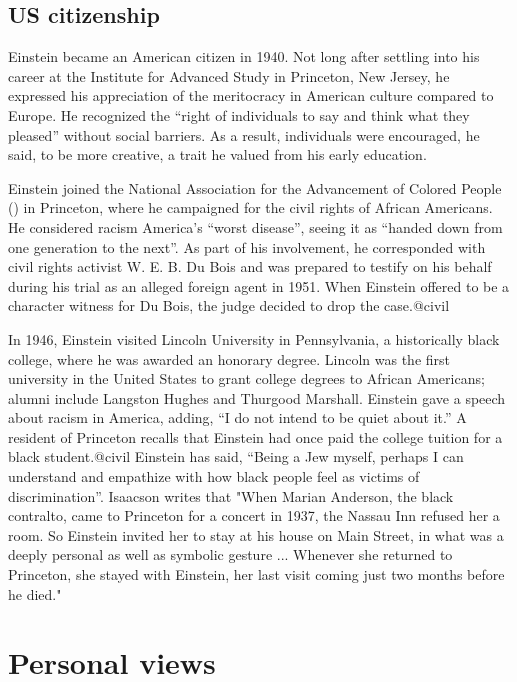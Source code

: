 \documentclass[twoside]{memoir}
\begin{document}
\section{US citizenship}
Einstein became an American citizen in 1940. Not long after settling into his career at the Institute for Advanced Study in Princeton, New Jersey, he expressed his appreciation of the meritocracy in American culture compared to Europe. He recognized the \enquote{right of individuals to say and think what they pleased} without social barriers. As a result, individuals were encouraged, he said, to be more creative, a trait he valued from his early education.

Einstein joined the National Association for the Advancement of Colored People () in Princeton, where he campaigned for the civil rights of African Americans. He considered racism America's \enquote{worst disease}, seeing it as \enquote{handed down from one generation to the next}. As part of his involvement, he corresponded with civil rights activist W. E. B. Du Bois and was prepared to testify on his behalf during his trial as an alleged foreign agent in 1951. When Einstein offered to be a character witness for Du Bois, the judge decided to drop the case.@civil

In 1946, Einstein visited Lincoln University in Pennsylvania, a historically black college, where he was awarded an honorary degree. Lincoln was the first university in the United States to grant college degrees to African Americans; alumni include Langston Hughes and Thurgood Marshall. Einstein gave a speech about racism in America, adding, \enquote{I do not intend to be quiet about it.} A resident of Princeton recalls that Einstein had once paid the college tuition for a black student.@civil Einstein has said, \enquote{Being a Jew myself, perhaps I can understand and empathize with how black people feel as victims of discrimination}. Isaacson writes that "When Marian Anderson, the black contralto, came to Princeton for a concert in 1937, the Nassau Inn refused her a room. So Einstein invited her to stay at his house on Main Street, in what was a deeply personal as well as symbolic gesture ... Whenever she returned to Princeton, she stayed with Einstein, her last visit coming just two months before he died."
\chapter{Personal views}
\end{document}
